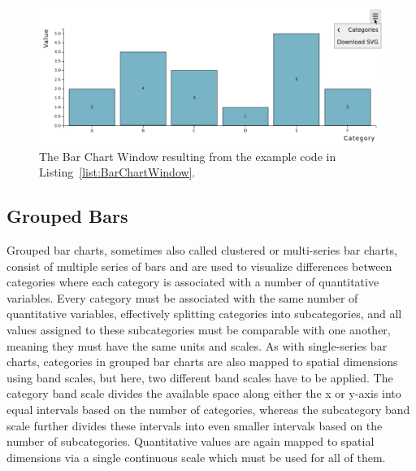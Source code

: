 \begin{figure}[tp]
\centering
\includegraphics[keepaspectratio,width=\linewidth,height=\halfh]
{images/bar-chart-window.png}
\caption[Bar Chart Window Example]{%
The Bar Chart Window resulting from the example code in
Listing~\ref{list:BarChartWindow}.
}
\label{fig:BarChartWindow}
\end{figure}






\subsection{Grouped Bars}

Grouped bar charts, sometimes also called clustered or multi-series
bar charts, consist of multiple series of bars and are used to
visualize differences between categories where each category is
associated with a number of quantitative variables. Every category
must be associated with the same number of quantitative variables,
effectively splitting categories into subcategories, and all values
assigned to these subcategories must be comparable with one another,
meaning they must have the same units and scales. As with
single-series bar charts, categories in grouped bar charts are also
mapped to spatial dimensions using band scales, but here, two
different band scales have to be applied. The category band scale
divides the available space along either the x or y-axis into
equal intervals based on the number of categories, whereas the
subcategory band scale further divides these intervals into even
smaller intervals based on the number of subcategories. Quantitative
values are again mapped to spatial dimensions via a single continuous
scale which must be used for all of them.

